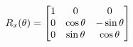 \documentclass[preview]{standalone}
\begin{document}
\begin{align*}
\special{dvisvgm:raw <g id='unique000'>}R_{x}(\theta) = \begin{bmatrix} 1 & 0 & 0 \\ 0 & \cos\theta & -\sin\theta \\ 0 & \sin\theta & \cos\theta \end{bmatrix}\special{dvisvgm:raw </g>}
\end{align*}
\end{document}
